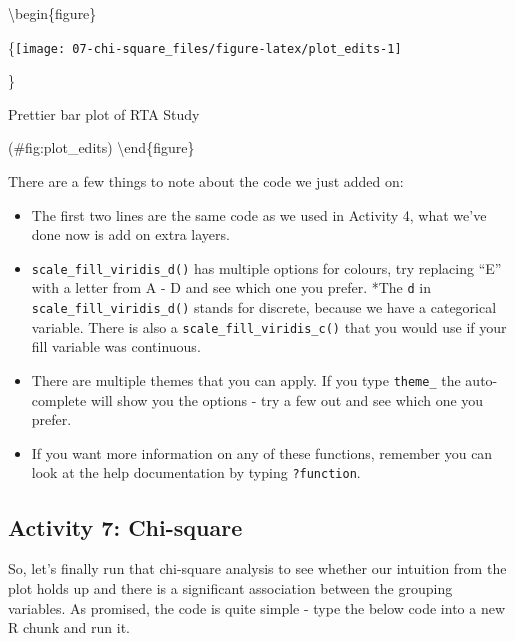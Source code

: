 \documentclass[]{book}
\newenvironment{Shaded}{\begin{snugshade}}{\end{snugshade}}
\newcommand{\CommentTok}[1]{\textcolor[rgb]{0.56,0.35,0.01}{\textit{#1}}}
\newcommand{\DataTypeTok}[1]{\textcolor[rgb]{0.13,0.29,0.53}{#1}}
\newcommand{\KeywordTok}[1]{\textcolor[rgb]{0.13,0.29,0.53}{\textbf{#1}}}
\newcommand{\NormalTok}[1]{#1}
\newcommand{\OperatorTok}[1]{\textcolor[rgb]{0.81,0.36,0.00}{\textbf{#1}}}
\newcommand{\OtherTok}[1]{\textcolor[rgb]{0.56,0.35,0.01}{#1}}
\newcommand{\StringTok}[1]{\textcolor[rgb]{0.31,0.60,0.02}{#1}}
\providecommand{\tightlist}{%
  \setlength{\itemsep}{0pt}\setlength{\parskip}{0pt}}
\begin{document}
\textbackslash{}begin\{figure\}

\{\centering \texttt{[image: 07-chi-square\_files/figure-latex/plot\_edits-1]}

\}

\caption{Prettier bar plot of RTA Study}

(\#fig:plot\_edits)
\textbackslash{}end\{figure\}

There are a few things to note about the code we just added on:

\begin{itemize}
\tightlist
\item
  The first two lines are the same code as we used in Activity 4, what we've done now is add on extra layers.\\
\item
  \texttt{scale\_fill\_viridis\_d()} has multiple options for colours, try replacing ``E'' with a letter from A - D and see which one you prefer.
  *The \texttt{d} in \texttt{scale\_fill\_viridis\_d()} stands for discrete, because we have a categorical variable. There is also a \texttt{scale\_fill\_viridis\_c()} that you would use if your fill variable was continuous.
\item
  There are multiple themes that you can apply. If you type \texttt{theme\_} the auto-complete will show you the options - try a few out and see which one you prefer.\\
\item
  If you want more information on any of these functions, remember you can look at the help documentation by typing \texttt{?function}.
\end{itemize}

\hypertarget{activity-7-chi-square}{%
\subsection{Activity 7: Chi-square}\label{activity-7-chi-square}}

So, let's finally run that chi-square analysis to see whether our intuition from the plot holds up and there is a significant association between the grouping variables. As promised, the code is quite simple - type the below code into a new R chunk and run it.

\begin{Shaded}
\end{Shaded}
\end{document}
